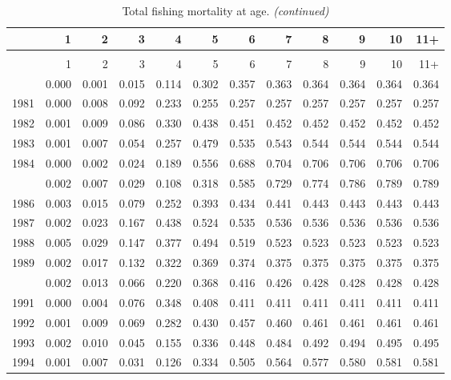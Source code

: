\documentclass[
]{article}
\begin{document}
\begin{longtable}[t]{lrrrrrrrrrrr}
\caption{\label{tab:FAA-tot-table}Total fishing mortality at age.}\\
\toprule
  & 1 & 2 & 3 & 4 & 5 & 6 & 7 & 8 & 9 & 10 & 11+\\
\midrule
\endfirsthead
\caption[]{Total fishing mortality at age. \textit{(continued)}}\\
\toprule
  & 1 & 2 & 3 & 4 & 5 & 6 & 7 & 8 & 9 & 10 & 11+\\
\midrule
\endhead

\endfoot
\bottomrule
\endlastfoot
1980 & 0.000 & 0.001 & 0.015 & 0.114 & 0.302 & 0.357 & 0.363 & 0.364 & 0.364 & 0.364 & 0.364\\
1981 & 0.000 & 0.008 & 0.092 & 0.233 & 0.255 & 0.257 & 0.257 & 0.257 & 0.257 & 0.257 & 0.257\\
1982 & 0.001 & 0.009 & 0.086 & 0.330 & 0.438 & 0.451 & 0.452 & 0.452 & 0.452 & 0.452 & 0.452\\
1983 & 0.001 & 0.007 & 0.054 & 0.257 & 0.479 & 0.535 & 0.543 & 0.544 & 0.544 & 0.544 & 0.544\\
1984 & 0.000 & 0.002 & 0.024 & 0.189 & 0.556 & 0.688 & 0.704 & 0.706 & 0.706 & 0.706 & 0.706\\
\addlinespace
1985 & 0.002 & 0.007 & 0.029 & 0.108 & 0.318 & 0.585 & 0.729 & 0.774 & 0.786 & 0.789 & 0.789\\
1986 & 0.003 & 0.015 & 0.079 & 0.252 & 0.393 & 0.434 & 0.441 & 0.443 & 0.443 & 0.443 & 0.443\\
1987 & 0.002 & 0.023 & 0.167 & 0.438 & 0.524 & 0.535 & 0.536 & 0.536 & 0.536 & 0.536 & 0.536\\
1988 & 0.005 & 0.029 & 0.147 & 0.377 & 0.494 & 0.519 & 0.523 & 0.523 & 0.523 & 0.523 & 0.523\\
1989 & 0.002 & 0.017 & 0.132 & 0.322 & 0.369 & 0.374 & 0.375 & 0.375 & 0.375 & 0.375 & 0.375\\
\addlinespace
1990 & 0.002 & 0.013 & 0.066 & 0.220 & 0.368 & 0.416 & 0.426 & 0.428 & 0.428 & 0.428 & 0.428\\
1991 & 0.000 & 0.004 & 0.076 & 0.348 & 0.408 & 0.411 & 0.411 & 0.411 & 0.411 & 0.411 & 0.411\\
1992 & 0.001 & 0.009 & 0.069 & 0.282 & 0.430 & 0.457 & 0.460 & 0.461 & 0.461 & 0.461 & 0.461\\
1993 & 0.002 & 0.010 & 0.045 & 0.155 & 0.336 & 0.448 & 0.484 & 0.492 & 0.494 & 0.495 & 0.495\\
1994 & 0.001 & 0.007 & 0.031 & 0.126 & 0.334 & 0.505 & 0.564 & 0.577 & 0.580 & 0.581 & 0.581\\

\end{longtable}
\end{document}
